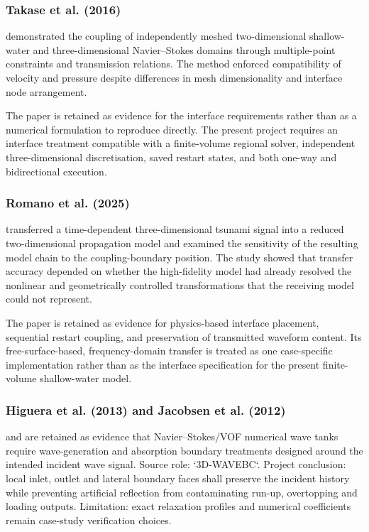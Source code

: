 \subsubsection{Takase et al. (2016)}
\label{sec:res-num-ibc-evidence-takase-2016}

\textcite{takase2016hybrid} demonstrated the coupling of independently meshed two-dimensional shallow-water and three-dimensional Navier--Stokes domains through multiple-point constraints and transmission relations. The method enforced compatibility of velocity and pressure despite differences in mesh dimensionality and interface node arrangement.

The paper is retained as evidence for the interface requirements rather than as a numerical formulation to reproduce directly. The present project requires an interface treatment compatible with a finite-volume regional solver, independent three-dimensional discretisation, saved restart states, and both one-way and bidirectional execution.

\subsubsection{Romano et al. (2025)}
\label{sec:res-num-ibc-evidence-romano-2025}

\textcite{romano2025coupling} transferred a time-dependent
three-dimensional tsunami signal into a reduced two-dimensional
propagation model and examined the sensitivity of the resulting model
chain to the coupling-boundary position. The study showed that transfer
accuracy depended on whether the high-fidelity model had already
resolved the nonlinear and geometrically controlled transformations
that the receiving model could not represent.

The paper is retained as evidence for physics-based interface placement,
sequential restart coupling, and preservation of transmitted waveform
content. Its free-surface-based, frequency-domain transfer is treated as
one case-specific implementation rather than as the interface
specification for the present finite-volume shallow-water model.

\subsubsection{Higuera et al. (2013) and Jacobsen et al. (2012)}
\label{sec:res-num-ibc-evidence-wave-boundaries}

\textcite{higuera2013realistic} and
\textcite{jacobsen2012waves2foam} are retained as evidence that
Navier--Stokes/VOF numerical wave tanks require wave-generation and
absorption boundary treatments designed around the intended incident
wave signal. Source role: `3D-WAVEBC`. Project conclusion: local
inlet, outlet and lateral boundary faces shall preserve the incident
history while preventing artificial reflection from contaminating
run-up, overtopping and loading outputs. Limitation: exact relaxation
profiles and numerical coefficients remain case-study verification
choices.

